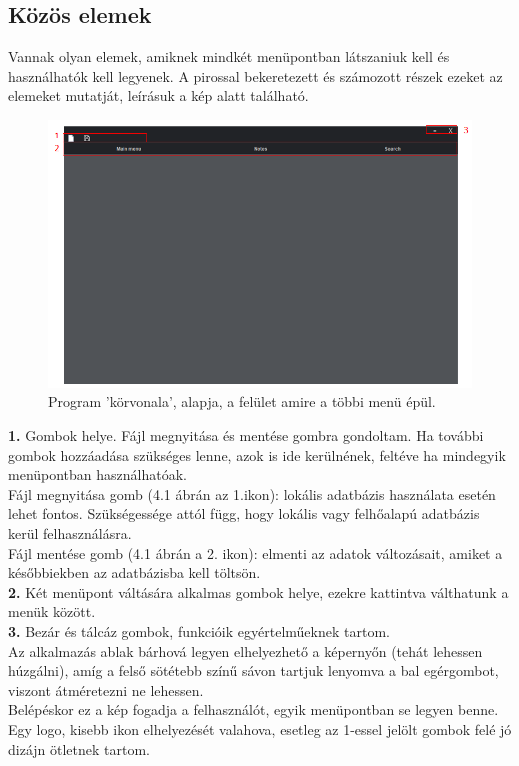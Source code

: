 \subsection{Közös elemek}

Vannak olyan elemek, amiknek mindkét menüpontban látszaniuk kell és használhatók kell legyenek. A pirossal bekeretezett és számozott részek ezeket az elemeket mutatját, leírásuk a kép alatt található.

\begin{figure}[h]
	\centering
	\includegraphics[scale=0.5]{images/menu_1.png}
	\caption{Program 'körvonala', alapja, a felület amire a többi menü épül.}
	\label{fig:main_foundation}
\end{figure}

\noindent \textbf{1.} Gombok helye. Fájl megnyitása és mentése gombra gondoltam. Ha további gombok hozzáadása szükséges lenne,  azok is ide kerülnének, feltéve ha mindegyik menüpontban használhatóak.
\vspace{5pt} \\Fájl megnyitása gomb (4.1 ábrán az 1.ikon): lokális adatbázis használata esetén lehet fontos. Szükségessége attól függ, hogy lokális vagy felhőalapú adatbázis kerül felhasználásra.
\vspace{5pt} \\Fájl mentése gomb (4.1 ábrán a 2. ikon): elmenti az adatok változásait, amiket a későbbiekben az adatbázisba kell töltsön.
\vspace{5pt} \\ \textbf{2.} Két menüpont váltására alkalmas gombok helye, ezekre kattintva válthatunk a menük között.
\vspace{5pt} \\ \textbf{3.} Bezár és tálcáz gombok, funkcióik egyértelműeknek tartom.
\vspace{10pt} \\Az alkalmazás ablak bárhová legyen elhelyezhető a képernyőn (tehát lehessen húzgálni), amíg a felső sötétebb színű sávon tartjuk lenyomva  a bal egérgombot, viszont átméretezni ne lehessen.
\vspace{5pt} \\Belépéskor ez a kép fogadja a felhasználót, egyik menüpontban se legyen benne.
\vspace{5pt} \\Egy logo, kisebb ikon elhelyezését valahova, esetleg az 1-essel jelölt gombok felé jó dizájn ötletnek tartom. 

